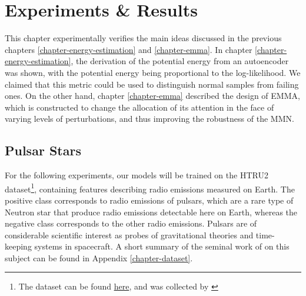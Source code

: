 \chapter{Experiments \& Results} 
\label{chapter-experiments} 

This chapter experimentally verifies the main ideas discussed in the previous chapters \ref{chapter-energy-estimation} and \ref{chapter-emma}. In chapter \ref{chapter-energy-estimation}, the derivation of the potential energy from an autoencoder was shown, with the potential energy being proportional to the log-likelihood. We claimed that this metric could be used to distinguish normal samples from failing ones. On the other hand, chapter \ref{chapter-emma} described the design of EMMA, which is constructed to change the allocation of its attention in the face of varying levels of perturbations, and thus improving the robustness of the MMN. 


\section{Pulsar Stars}
For the following experiments, our models will be trained on the HTRU2 dataset\footnote{The dataset can be found \href{https://archive.ics.uci.edu/ml/datasets/HTRU2}{here}, and was collected by \citep{HTRU}}, containing features describing radio emissions measured on Earth. The positive class corresponds to radio emissions of pulsars, which are a rare type of Neutron star that produce radio emissions detectable here on Earth, whereas the negative class corresponds to the other radio emissions. Pulsars are of considerable scientific interest as probes of gravitational theories and time-keeping systems in spacecraft. A short summary of the seminal work of \citep{lyon} on this subject can be found in Appendix \ref{chapter-dataset}. 

